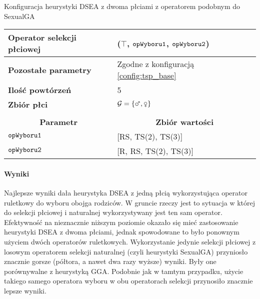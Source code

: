 \documentclass[./FM_mgr.tex]{subfiles}
\begin{document}
\begin{config}
	\caption{Konfiguracja heurystyki DSEA z dwoma płciami z operatorem podobnym do SexualGA \label{config:tsp_dsea_sexual_ga_true}}
	\centering
	\begin{tabularx}{\linewidth}{lX}
		\hline
		\multicolumn{1}{|l|}{{\bf Operator selekcji płciowej}} &
		\multicolumn{1}{l|}{\opName{stdGenSel}($\top$, $\mathtt{opWyboru1}$, $\mathtt{opWyboru2}$)} \\ 
		\hline
		\multicolumn{1}{|l|}{{\bf Pozostałe parametry}} &
		\multicolumn{1}{l|}{Zgodne z konfiguracją \ref{config:tsp_base}} \\ 
		\hline
		\multicolumn{1}{|l|}{{\bf Ilość powtórzeń}} &
		\multicolumn{1}{l|}{5} \\ 
		\hline
		\multicolumn{1}{|l|}{{\bf Zbiór płci}} & 
		\multicolumn{1}{l|}{$\important{G} = \{ \male, \female \}$} \\ 
		\hline
		& \\ 
		\hline
		\multicolumn{1}{|c|}{{\bf Parametr}} & 
		\multicolumn{1}{c|}{{\bf Zbiór wartości}} \\ 
		\hline \hline
		\multicolumn{1}{|l|}{$\mathtt{opWyboru1}$} & 
		\multicolumn{1}{l|}{[RS, TS(2), TS(3)]} \\ 
		\hline
		\multicolumn{1}{|l|}{$\mathtt{opWyboru2}$} & 
		\multicolumn{1}{l|}{[R, RS, TS(2), TS(3)]} \\
		\hline
	\end{tabularx}
\end{config}

\paragraph{Wyniki} Najlepsze wyniki dała heurystyka DSEA z jedną płcią wykorzystująca operator ruletkowy do wyboru obojga rodziców.
W gruncie rzeczy jest to sytuacja w której do selekcji płciowej i naturalnej wykorzystywany jest ten sam operator.
Efektywność na nieznacznie niższym poziomie okazało się mieć zastosowanie heurystyki DSEA z dwoma płciami, jednak spowodowane to było ponownym użyciem dwóch operatorów ruletkowych.
Wykorzystanie jedynie selekcji płciowej z losowym operatorem selekcji naturalnej (czyli heurystyki SexualGA) przyniosło znacznie gorsze (półtora, a nawet dwa razy wyższe) wyniki.
Były one porównywalne z heurystyką GGA.
Podobnie jak w tamtym przypadku, użycie takiego samego operatora wyboru w obu operatorach selekcji przynosiło znacznie lepsze wyniki.
\end{document}
